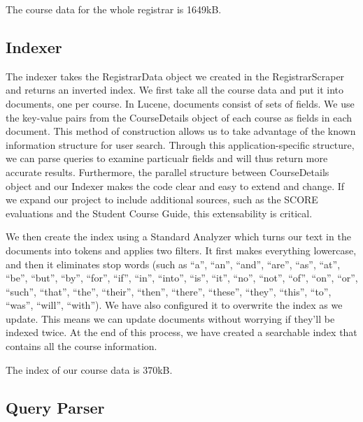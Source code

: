 \documentclass[12pt,letterpaper]{article}
\begin{document}
The course data for the whole registrar is 1649kB.

\subsection{Indexer}
	
The indexer takes the RegistrarData object we created in the RegistrarScraper and returns an inverted index. We first take all the course data and put it into documents, one per course. In Lucene, documents consist of sets of fields. We use the key-value pairs from the CourseDetails object of each course as fields in each document. This method of construction allows us to take advantage of the known information structure for user search. Through this application-specific structure, we can parse queries to examine particualr fields and will thus return more accurate results. Furthermore, the parallel structure between CourseDetails object and our Indexer makes the code clear and easy to extend and change. If we expand our project to include additional sources, such as the SCORE evaluations and the Student Course Guide, this extensability is critical. 

We then create the index using a Standard Analyzer which turns our text in the documents into tokens and applies two filters. It first makes everything lowercase, and then it eliminates stop words (such as ``a'', ``an'',  ``and'', ``are'', ``as'', ``at'', ``be'', ``but'', ``by'', ``for'', ``if'', ``in'', ``into'', ``is'', ``it'', ``no'', ``not'', ``of'', ``on'', ``or'', ``such'', ``that'', ``the'', ``their'', ``then'', ``there'', ``these'', ``they'', ``this'', ``to'', ``was'', ``will'', ``with''). We have also configured it to overwrite the index as we update. This means we can update documents without worrying if they'll be indexed twice. At the end of this process, we have created a searchable index that contains all the course information. 

The index of our course data is 370kB.
	
\subsection{Query Parser}
	
\end{document}
